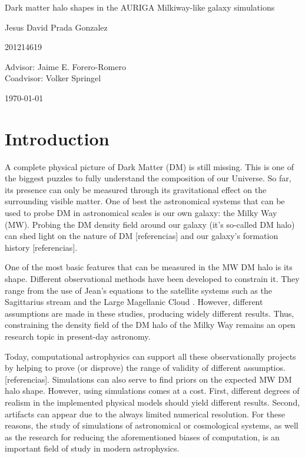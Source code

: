 \documentclass[12pt]{article}
\begin{document}
\begin{center}
\Huge
Dark matter halo shapes in the AURIGA Milkiway-like galaxy simulations

\vspace{3mm}
\Large Jesus David Prada Gonzalez

\large
201214619


\vspace{2mm}
\Large
Advisor: Jaime E. Forero-Romero\\
Coadvisor: Volker Springel
\normalsize
\vspace{2mm}

\today
\end{center}


\normalsize
\section{Introduction}


A complete physical picture of Dark Matter (DM) is still missing.
This is one of the biggest puzzles to fully understand the composition of our Universe.
So far, its presence can only be measured through its gravitational effect on the surrounding visible matter. 
One of best the astronomical systems that can be used to probe DM in astronomical scales is our own galaxy: the Milky Way (MW).
Probing the DM density field around our galaxy (it's so-called DM halo) can shed light on the nature of DM [referencias] and our galaxy's formation history [referencias].

One of the most basic features that can be measured in the MW DM halo is its shape. 
Different observational methods have been developed to constrain it. 
They range from the use of Jean's equations \cite{Loebman et al. 2012} to the satellite systems such as the Sagittarius stream and the Large Magellanic Cloud \cite{Vera-Ciro et al  2013, Deg & Widrow 2012, Law & Majewski 2010}. 
However, different assumptions are made in these studies, producing widely different results.
Thus, constraining the density field of the DM halo of the Milky Way remains an open research topic in present-day astronomy. 

Today, computational astrophysics can support all these observationally projects by helping to prove (or disprove) the range of validity of different assumptios. [referencias].
Simulations can also serve to find priors on the expected MW DM halo shape.
However, using simulations comes at a cost.
First, different degrees of realism in the implemented physical models should yield different results.
Second, artifacts can appear due to the always limited numerical resolution. 
For these reasons, the study of simulations of astronomical or cosmological systems, as well as the research for reducing the aforementioned biases of computation, is an important field of study in modern astrophysics.\\
\end{document}
